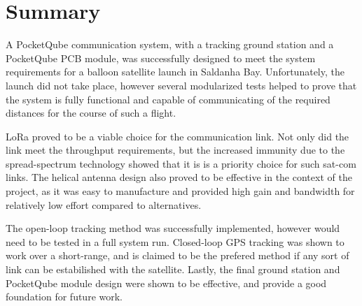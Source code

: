 \section{Summary}

A PocketQube communication system, with a tracking ground station and a PocketQube PCB module, was successfully designed to meet the system requirements for a balloon satellite launch in Saldanha Bay. Unfortunately, the launch did not take place, however several modularized tests helped to prove that the system is fully functional and capable of communicating of the required distances for the course of such a flight.

LoRa proved to be a viable choice for the communication link. Not only did the link meet the throughput requirements, but the increased immunity due to the spread-spectrum technology showed that it is is a priority choice for such sat-com links. The helical antenna design also proved to be effective in the context of the project, as it was easy to manufacture and provided high gain and bandwidth for relatively low effort compared to alternatives.

The open-loop tracking method was successfully implemented, however would need to be tested in a full system run. Closed-loop GPS tracking was shown to work over a short-range, and is claimed to be the prefered method if any sort of link can be estabilished with the satellite. Lastly, the final ground station and PocketQube module design were shown to be effective, and provide a good foundation for future work.
